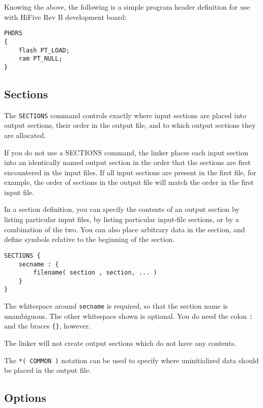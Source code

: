 \documentclass[a4paper,12pt,twoside]{report}
\begin{document}
                Knowing the above, the following is a simple program header definition for use with HiFive Rev B development board:
\begin{lstlisting}
PHDRS
{
    flash PT_LOAD;
    ram PT_NULL;
}
\end{lstlisting}

            \subsection{Sections}
                The \lstinline|SECTIONS| command controls exactly where input sections are placed into output sections, their order in the output file, and to which output sections they are allocated.\cite{gnuldOutputSections}

                If you do not use a SECTIONS command, the linker places each input section into an identically named output section in the order that the sections are first encountered in the input files. If all input sections are present in the first file, for example, the order of sections in the output file will match the order in the first input file.\cite{gnuldOutputSections}

                In a section definition, you can specify the contents of an output section by listing particular input files, by listing particular input-file sections, or by a combination of the two. You can also place arbitrary data in the section, and define symbols relative to the beginning of the section.\cite{gnuldOutputSections}
\begin{verbatim}
SECTIONS {
    secname : {
        filename( section , section, ... )
    }
}
\end{verbatim}
                The whitespace around \lstinline|secname| is required, so that the section name is unambiguous. The other whitespace shown is optional. You do need the colon \lstinline|:| and the braces \lstinline|{}|, however.\cite{gnuldOutputSections}

                The linker will not create output sections which do not have any contents.\cite{gnuldOutputSections}

                The \lstinline|*( COMMON )| notation can be used to specify where uninitialized data should be placed in the output file.\cite{gnuldOutputSections}

            \subsection{Options}
\end{document}
